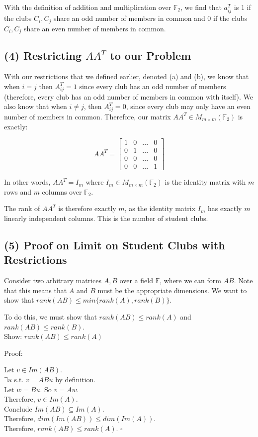 \documentclass[12pt, letterpaper]{article}
\newcommand{\F}{\mathbb{F}}
\newcommand{\0}{\textbf{0}}
\newcommand{\1}{\textbf{1}}
\begin{document}
With the definition of addition and multiplication over $\F_2$, we find that $a^T_{ij}$ is 1 if the clubs $C_i, C_j$ share an odd number of members in common and 0 if the clubs $C_i, C_j$ share an even number of members in common.

\subsection*{(4) \textmd{Restricting $AA^T$ to our Problem}}

With our restrictions that we defined earlier, denoted (a) and (b), we know that when $i=j$ then $A^T_{ij} = 1$ since every club has an odd number of members (therefore, every club has an odd number of members in common with itself). We also know that when $i \ne j$, then $A^T_{ij} = 0$, since every club may only have an even number of members in common. Therefore, our matrix $AA^T \in M_{m \times m}(\F_2)$ is exactly:

\renewcommand{\arraystretch}{0.8}
$$
AA^T =
\begin{bmatrix}
1 & 0 & ... & 0  \\
0 & 1 & ... & 0  \\
0 & 0 & ... & 0  \\
0 & 0 & ... & 1 
\end{bmatrix}
$$

In other words, $AA^T = I_m$ where $I_m \in M_{m \times m}(\F_2)$ is the identity matrix with $m$ rows and $m$ columns over $\F_2$.

The rank of $AA^T$ is therefore exactly $m$, as the identity matrix $I_m$ has exactly $m$ linearly independent columns. This is the number of student clubs.

\subsection*{(5) \textmd{Proof on Limit on Student Clubs with Restrictions}}

Consider two arbitrary matrices $A,B$ over a field $\F$, where we can form $AB$. Note that this means that $A$ and $B$ must be the appropriate dimensions. We want to show that $ rank(AB) \le min\{rank(A), rank(B)\}$.

To do this, we must show that $rank(AB) \le rank(A)$ and $rank(AB) \le rank(B)$. \\

Show: $rank(AB) \le rank(A)$

Proof:

Let $v \in Im(AB)$. \\
$\exists u$ s.t. $v = ABu$ by definition. \\
Let $w = Bu$. So $v = Aw$. \\
Therefore, $v \in Im(A)$. \\
Conclude $Im(AB) \subseteq Im(A)$. \\
Therefore, $dim(Im(AB)) \le dim(Im(A))$. \\
Therefore, $rank(AB) \le rank(A)$. $\square$ \\
\end{document}
